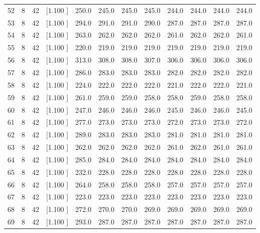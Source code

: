 \documentclass[12pt,a4paper]{article}
\begin{document}
\begin{center}
{\begin{tabular}{r r r r r r r r r r r r}
  52&  8& 42&[1.100     ]&   250.0&   245.0&   245.0&   245.0&   244.0&   244.0&   244.0&   244.0\\[-0.02in]
  53&  8& 42&[1.100     ]&   294.0&   291.0&   291.0&   290.0&   287.0&   287.0&   287.0&   287.0\\[-0.02in]
  54&  8& 42&[1.100     ]&   263.0&   262.0&   262.0&   262.0&   261.0&   262.0&   262.0&   261.0\\[-0.02in]
  55&  8& 42&[1.100     ]&   220.0&   219.0&   219.0&   219.0&   219.0&   219.0&   219.0&   219.0\\[-0.02in]
  56&  8& 42&[1.100     ]&   313.0&   308.0&   308.0&   307.0&   306.0&   306.0&   306.0&   306.0\\[-0.02in]
  57&  8& 42&[1.100     ]&   286.0&   283.0&   283.0&   283.0&   282.0&   282.0&   282.0&   282.0\\[-0.02in]
  58&  8& 42&[1.100     ]&   224.0&   222.0&   222.0&   222.0&   221.0&   222.0&   222.0&   221.0\\[-0.02in]
  59&  8& 42&[1.100     ]&   261.0&   259.0&   259.0&   258.0&   258.0&   259.0&   258.0&   258.0\\[-0.02in]
  60&  8& 42&[1.100     ]&   247.0&   246.0&   246.0&   246.0&   245.0&   246.0&   246.0&   245.0\\[-0.02in]
  61&  8& 42&[1.100     ]&   277.0&   273.0&   273.0&   273.0&   272.0&   273.0&   273.0&   272.0\\[-0.02in]
  62&  8& 42&[1.100     ]&   289.0&   283.0&   283.0&   283.0&   281.0&   281.0&   281.0&   281.0\\[-0.02in]
  63&  8& 42&[1.100     ]&   262.0&   262.0&   262.0&   262.0&   261.0&   262.0&   261.0&   261.0\\[-0.02in]
  64&  8& 42&[1.100     ]&   285.0&   284.0&   284.0&   284.0&   284.0&   284.0&   284.0&   284.0\\[-0.02in]
  65&  8& 42&[1.100     ]&   232.0&   228.0&   228.0&   228.0&   228.0&   228.0&   228.0&   228.0\\[-0.02in]
  66&  8& 42&[1.100     ]&   264.0&   258.0&   258.0&   258.0&   257.0&   257.0&   257.0&   257.0\\[-0.02in]
  67&  8& 42&[1.100     ]&   223.0&   223.0&   223.0&   223.0&   223.0&   223.0&   223.0&   223.0\\[-0.02in]
  68&  8& 42&[1.100     ]&   272.0&   270.0&   270.0&   269.0&   269.0&   269.0&   269.0&   269.0\\[-0.02in]
  69&  8& 42&[1.100     ]&   293.0&   287.0&   287.0&   287.0&   287.0&   287.0&   287.0&   287.0\\[-0.02in]

\end{tabular}}
\end{center}
\end{document}
